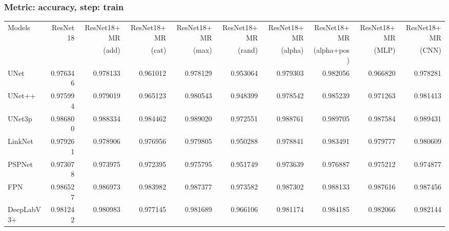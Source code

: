\documentclass{article}
\begin{document}
\subsubsection{Metric: accuracy, step: train}
\begin{tabular}{lrrrrrrrrr}
\toprule
Models & ResNet18 & ResNet18+MR & ResNet18+MR & ResNet18+MR & ResNet18+MR & ResNet18+MR & ResNet18+MR & ResNet18+MR & ResNet18+MR \\
       &          &       (add) &       (cat) &       (max) &      (rand) &     (alpha) & (alpha+pos) &       (MLP) &       (CNN) \\
\midrule
UNet & 0.976346 & 0.978133 & 0.961012 & 0.978129 & 0.953064 & 0.979303 & 0.982056 & 0.966820 & 0.978281 \\
UNet++ & 0.975994 & 0.979019 & 0.965123 & 0.980543 & 0.948399 & 0.978542 & 0.985239 & 0.971263 & 0.981413 \\
UNet3p & 0.986800 & 0.988334 & 0.984462 & 0.989020 & 0.972551 & 0.988761 & 0.989705 & 0.987584 & 0.989431 \\
LinkNet & 0.979261 & 0.978906 & 0.976956 & 0.979805 & 0.950288 & 0.978841 & 0.983491 & 0.979777 & 0.980609 \\
PSPNet & 0.973078 & 0.973975 & 0.972395 & 0.975795 & 0.951749 & 0.973639 & 0.976887 & 0.975212 & 0.974877 \\
FPN & 0.986527 & 0.986973 & 0.983982 & 0.987377 & 0.973582 & 0.987302 & 0.988133 & 0.987616 & 0.987456 \\
DeepLabV3+ & 0.981242 & 0.980983 & 0.977145 & 0.981689 & 0.966106 & 0.981174 & 0.984185 & 0.982066 & 0.982144 \\
\bottomrule
\end{tabular}
\end{document}
